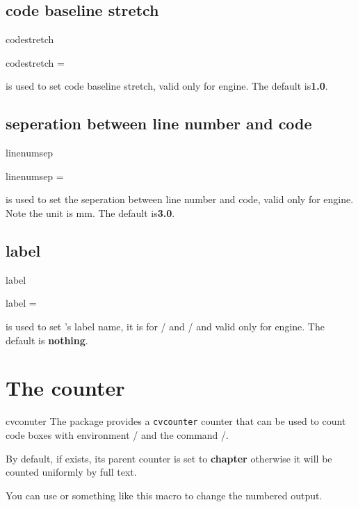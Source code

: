 \documentclass{ctxdoc-en}
\begin{document}
\subsection{code baseline stretch}

\begin{function}[added=2021-12-26,updated=2021-12-26]{codestretch}
  \begin{syntax}
    codestretch =  
  \end{syntax}
   is used to set code baseline stretch, valid only for  engine.
  The default is\textbf{1.0}.
\end{function}

\subsection{seperation between line number and code}

\begin{function}[added=2021-12-26,updated=2021-12-26]{linenumsep}
  \begin{syntax}
    linenumsep =  
  \end{syntax}
   is used to set the seperation between line number and code,
  valid only for  engine.
  Note the unit is mm.
  The default is\textbf{3.0}.
\end{function}

\subsection{label}

\begin{function}[added=2022-1-4,updated=2022-1-4]{label}
  \begin{syntax}
    label =  
  \end{syntax}
   is used to set  's label name,
  it is for / and /
  and valid only for  engine.
  The default is \textbf{nothing}.
\end{function}

\section{The counter}

\begin{function}[added=2021-12-28,updated=2021-12-28]{cvconuter}
  The  package provides a \texttt{cvcounter} counter 
  that can be used to count code boxes with environment /
  and the command /. 

  By default, if  exists, its parent counter is set to \textbf{chapter}
  otherwise it will be counted uniformly by full text. 

  You can use 
  or something like this macro to change the numbered output.
\end{function}
\end{document}
